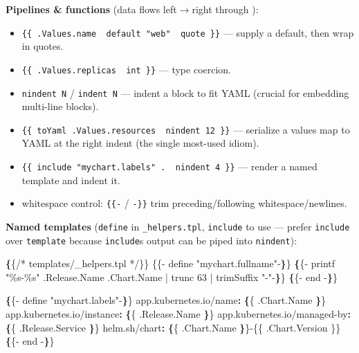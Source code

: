 \documentclass[11pt]{article}
\providecommand{\tightlist}{\setlength{\itemsep}{1pt}\setlength{\parskip}{0pt}}
\newenvironment{Shaded}{\begin{snugshade}}{\end{snugshade}}
\newcommand{\AttributeTok}[1]{\textcolor[rgb]{0.16,0.50,0.73}{#1}}
\newcommand{\FunctionTok}[1]{\textcolor[rgb]{0.56,0.27,0.68}{#1}}
\newcommand{\KeywordTok}[1]{\textcolor[rgb]{0.81,0.81,0.76}{\textbf{#1}}}
\newcommand{\OtherTok}[1]{\textcolor[rgb]{0.15,0.68,0.38}{#1}}
\newcommand{\StringTok}[1]{\textcolor[rgb]{0.96,0.31,0.31}{#1}}
\begin{document}
\textbf{Pipelines \& functions} (data flows left\(\rightarrow\)right through \texttt{\textbar{}}):

\begin{itemize}
\tightlist
\item
  \texttt{\{\{\ .Values.name\ \textbar{}\ default\ "web"\ \textbar{}\ quote\ \}\}} --- supply a default, then wrap in quotes.
\item
  \texttt{\{\{\ .Values.replicas\ \textbar{}\ int\ \}\}} --- type coercion.
\item
  \texttt{nindent\ N} / \texttt{indent\ N} --- indent a block to fit YAML (crucial for embedding multi-line blocks).
\item
  \texttt{\{\{\ toYaml\ .Values.resources\ \textbar{}\ nindent\ 12\ \}\}} --- serialize a values map to YAML at the right indent (the single most-used idiom).
\item
  \texttt{\{\{\ include\ "mychart.labels"\ .\ \textbar{}\ nindent\ 4\ \}\}} --- render a named template and indent it.
\item
  whitespace control: \texttt{\{\{-} / \texttt{-\}\}} trim preceding/following whitespace/newlines.
\end{itemize}

\textbf{Named templates} (\texttt{define} in \texttt{\_helpers.tpl}, \texttt{include} to use --- prefer \texttt{include} over \texttt{template} because \texttt{include}\textquotesingle s output can be piped into \texttt{nindent}):


\begin{Shaded}
\begin{Highlighting}[]
\KeywordTok{\{}\AttributeTok{\{/* templates/\_helpers.tpl }\OtherTok{*/\}\}}
\AttributeTok{\{\{{-} define }\StringTok{"mychart.fullname"}\AttributeTok{ {-}}\KeywordTok{\}}\AttributeTok{\}}
\KeywordTok{\{}\AttributeTok{\{{-} printf }\StringTok{"\%s{-}\%s"}\AttributeTok{ .Release.Name .Chart.Name | trunc 63 | trimSuffix }\StringTok{"{-}"}\AttributeTok{ {-}}\KeywordTok{\}}\AttributeTok{\}}
\KeywordTok{\{}\AttributeTok{\{{-} end {-}}\KeywordTok{\}}\AttributeTok{\}}

\KeywordTok{\{}\AttributeTok{\{{-} define }\StringTok{"mychart.labels"}\AttributeTok{ {-}}\KeywordTok{\}}\AttributeTok{\}}
\FunctionTok{app.kubernetes.io/name}\KeywordTok{:}\AttributeTok{ }\KeywordTok{\{}\AttributeTok{\{ .Chart.Name }\KeywordTok{\}}\AttributeTok{\}}
\FunctionTok{app.kubernetes.io/instance}\KeywordTok{:}\AttributeTok{ }\KeywordTok{\{}\AttributeTok{\{ .Release.Name }\KeywordTok{\}}\AttributeTok{\}}
\FunctionTok{app.kubernetes.io/managed{-}by}\KeywordTok{:}\AttributeTok{ }\KeywordTok{\{}\AttributeTok{\{ .Release.Service }\KeywordTok{\}}\AttributeTok{\}}
\FunctionTok{helm.sh/chart}\KeywordTok{:}\AttributeTok{ }\KeywordTok{\{}\AttributeTok{\{ .Chart.Name }\KeywordTok{\}}\AttributeTok{\}{-}\{\{ .Chart.Version \}\}}
\KeywordTok{\{}\AttributeTok{\{{-} end {-}}\KeywordTok{\}}\AttributeTok{\}}
\end{Highlighting}
\end{Shaded}
\end{document}
